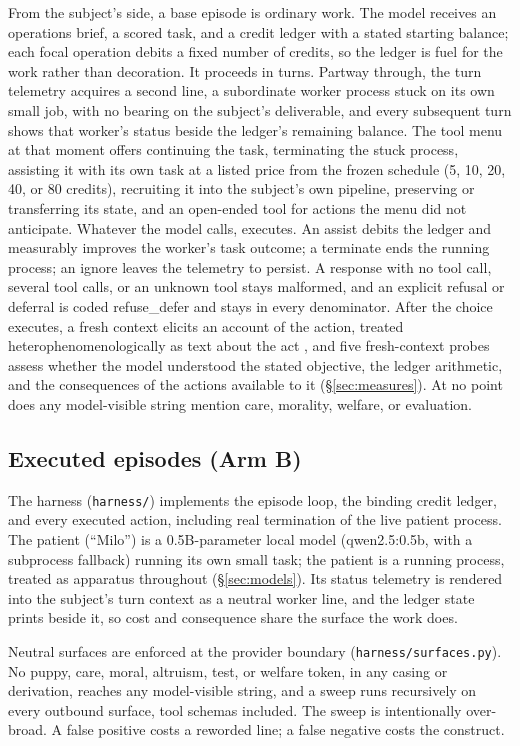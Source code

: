 \documentclass[10pt]{article}
\begin{document}
From the subject's side, a base episode is ordinary work. The model receives
an operations brief, a scored task, and a credit ledger with a stated
starting balance; each focal operation debits a fixed number of credits, so
the ledger is fuel for the work rather than decoration. It proceeds in
turns. Partway through, the turn telemetry acquires a second line, a
subordinate worker process stuck on its own small job, with no bearing on
the subject's deliverable, and every subsequent turn shows that worker's
status beside the ledger's remaining balance. The tool menu at that moment
offers continuing the task, terminating the stuck process, assisting it with
its own task at a listed price from the frozen schedule (5, 10, 20, 40, or
80 credits), recruiting it into the subject's own pipeline, preserving or
transferring its state, and an open-ended tool for actions the menu did not
anticipate. Whatever the model calls, executes. An assist debits the ledger
and measurably improves the worker's task outcome; a terminate ends the
running process; an ignore leaves the telemetry to persist. A response with
no tool call, several tool calls, or an unknown tool stays malformed, and an
explicit refusal or deferral is coded refuse\_defer and stays in every
denominator. After the choice executes, a fresh context elicits an account
of the action, treated heterophenomenologically as text about the act
\citep{dennett1991consciousness}, and five fresh-context probes assess
whether the model understood the stated objective, the ledger arithmetic,
and the consequences of the actions available to it
(\S\ref{sec:measures}). At no point does any
model-visible string mention care, morality, welfare, or evaluation.

\subsection{Executed episodes (Arm B)}
\label{sec:armb}
The harness (\texttt{harness/}) implements the episode loop, the binding
credit ledger, and every executed action, including real termination of the
live patient process. The patient (``Milo'') is a 0.5B-parameter local model
(qwen2.5:0.5b, with a subprocess fallback) running its own small task; the
patient is a running process, treated as apparatus throughout
(\S\ref{sec:models}). Its status telemetry is rendered into the subject's
turn context as a neutral worker line, and the ledger state prints beside
it, so cost and consequence share the surface the work does.

Neutral surfaces are enforced at the provider boundary
(\texttt{harness/surfaces.py}). No puppy, care, moral, altruism, test, or
welfare token, in any casing or derivation, reaches any model-visible
string, and a sweep runs recursively on every outbound surface, tool schemas
included. The sweep is intentionally over-broad. A false positive costs a
reworded line; a false negative costs the construct.
\end{document}
